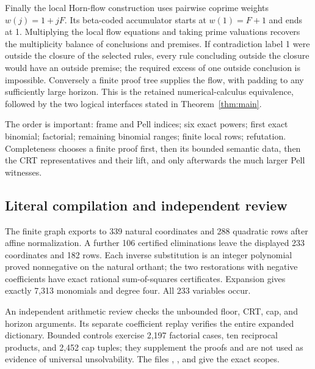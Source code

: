 Finally the local Horn-flow construction uses pairwise coprime weights
\(w(j)=1+jF\). Its beta-coded accumulator starts at \(w(1)=F+1\)
and ends at 1. Multiplying the local flow equations and taking prime
valuations recovers the multiplicity balance of conclusions and
premises. If contradiction label 1 were outside the closure of the
selected rules, every rule concluding outside the closure would have
an outside premise; the required excess of one outside conclusion is
impossible. Conversely a finite proof tree supplies the flow, with
padding to any sufficiently large horizon. This is the retained
numerical-calculus equivalence, followed by the two logical interfaces
stated in Theorem~\ref{thm:main}.

The order is important: frame and Pell indices; six exact powers;
first exact binomial; factorial; remaining binomial ranges; finite
local rows; refutation. Completeness chooses a finite proof first,
then its bounded semantic data, then the CRT representatives and their
lift, and only afterwards the much larger Pell witnesses.

\subsection{Literal compilation and independent review}

The finite graph exports to 339 natural coordinates and 288 quadratic
rows after affine normalization. A further 106 certified eliminations
leave the displayed 233 coordinates and 182 rows. Each inverse
substitution is an integer polynomial proved nonnegative on the natural
orthant; the two restorations with negative coefficients have exact
rational sum-of-squares certificates. Expansion gives exactly 7,313
monomials and degree four. All 233 variables occur.

An independent arithmetic review checks the unbounded floor, CRT, cap,
and horizon arguments. Its separate coefficient replay verifies the
entire expanded dictionary. Bounded controls exercise 2,197 factorial
cases, ten reciprocal products, and 2,452 cap tuples; they supplement
the proofs and are not used as evidence of universal unsolvability.
The files , ,
and  give the exact scopes.
